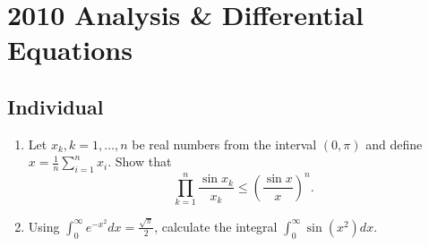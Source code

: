 \section{2010 Analysis \& Differential Equations}

\subsection{Individual}

\begin{exercise}
\label{analysis:2010:1}
\begin{enumerate}
    \item Let $x_k, k = 1, \dots, n$ be real numbers from the interval $(0, \pi)$ and define $x = \frac{1}{n} \sum_{i=1}^n x_i$. Show that
    \[
    \prod_{k=1}^n \frac{\sin x_k}{x_k} \leq \left( \frac{\sin x}{x} \right)^n.
    \]
    \item Using $\int_0^\infty e^{-x^2} dx = \frac{\sqrt{\pi}}{2}$, calculate the integral $\int_0^\infty \sin(x^2) dx$.
\end{enumerate}
\end{exercise}

